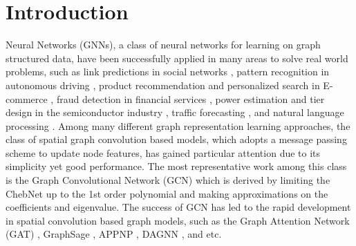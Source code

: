\documentclass[lettersize,journal]{IEEEtran}
\theoremstyle{plain}
\theoremstyle{definition}
\theoremstyle{remark}
\begin{document}
\section{Introduction}
\label{intro}
 Neural Networks (GNNs), a class of neural networks for learning on graph structured data, have been successfully applied in many areas to solve real world problems, such as link predictions in social networks \cite{fan2019graph}, pattern recognition in autonomous driving \cite{shi2020point}, product recommendation and personalized search in E-commerce \cite{zhu2019aligraph}, fraud detection in financial services \cite{wang2019semi}, power estimation and tier design in the semiconductor industry \cite{zhang2020grannite, lu2020tp}, traffic forecasting \cite{yu2017spatio}, and natural language processing \cite{yao2019graph, vashishth2020graph, wu2021deep}. Among many different graph representation learning approaches, the class of spatial graph convolution based models, which adopts a message passing scheme to update node features, has gained particular attention due to its simplicity yet good performance. The most representative work among this class is the Graph Convolutional Network (GCN) \cite{DBLP:conf/iclr/KipfW17} which is derived by limiting the ChebNet \cite{defferrard2016convolutional} up to the 1st order polynomial and making approximations on the coefficients and eigenvalue. The success of GCN \cite{ying2018graph, hu2020open} has led to the rapid development in spatial convolution based graph models, such as the Graph Attention Network (GAT) \cite{DBLP:conf/iclr/VelickovicCCRLB18}, GraphSage \cite{hamilton2017inductive}, APPNP \cite{klicpera2018predict}, DAGNN \cite{liu2020towards}, and etc.
\end{document}
